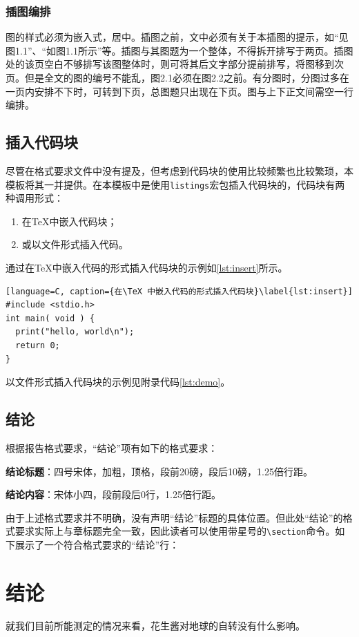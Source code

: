 \subsubsection{插图编排}

图的样式必须为嵌入式，居中。插图之前，文中必须有关于本插图的提示，如“见图1.1”、“如图1.1所示”等。插图与其图题为一个整体，不得拆开排写于两页。插图处的该页空白不够排写该图整体时，则可将其后文字部分提前排写，将图移到次页。但是全文的图的编号不能乱，图2.1必须在图2.2之前。有分图时，分图过多在一页内安排不下时，可转到下页，总图题只出现在下页。图与上下正文间需空一行编排。

\subsection{插入代码块}

尽管在格式要求文件中没有提及，但考虑到代码块的使用比较频繁也比较繁琐，本模板将其一并提供。在本模板中是使用\texttt{listings}宏包插入代码块的，代码块有两种调用形式：

\begin{enumerate}
  \item 在\TeX 中嵌入代码块；
  \item 或以文件形式插入代码。
\end{enumerate}

通过在\TeX 中嵌入代码的形式插入代码块的示例如\ref{lst:insert}所示。

\begin{lstlisting}[language=C, caption={在\TeX 中嵌入代码的形式插入代码块}\label{lst:insert}]
#include <stdio.h>
int main( void ) {
  print("hello, world\n");
  return 0;
}
\end{lstlisting}

以文件形式插入代码块的示例见附录代码\ref{lst:demo}。
    
\subsection{结论}

根据报告格式要求，“结论”项有如下的格式要求：

\textbf{结论标题}：四号宋体，加粗，顶格，段前20磅，段后10磅，1.25倍行距。

\textbf{结论内容}：宋体小四，段前段后0行，1.25倍行距。

由于上述格式要求并不明确，没有声明“结论”标题的具体位置。但此处“结论”的格式要求实际上与章标题完全一致，因此读者可以使用带星号的\texttt{\textbackslash \*section}命令。如下展示了一个符合格式要求的“结论”行：

\section*{结论}

就我们目前所能测定的情况来看，花生酱对地球的自转没有什么影响\autocite{PeanutButter}。
